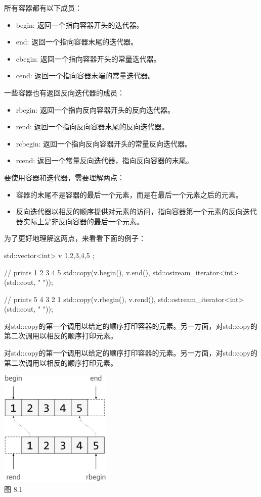 所有容器都有以下成员：

\begin{itemize}
  \item begin: 返回一个指向容器开头的迭代器。
  \item end: 返回一个指向容器末尾的迭代器。
  \item cbegin: 返回一个指向容器开头的常量迭代器。
  \item cend: 返回一个指向容器末端的常量迭代器。
\end{itemize}

一些容器也有返回反向迭代器的成员：

\begin{itemize}
  \item rbegin: 返回一个指向反向容器开头的反向迭代器。
  \item rend: 返回一个指向反向容器末尾的反向迭代器。
  \item rcbegin: 返回一个指向反向容器开头的常量反向迭代器。
  \item rcend: 返回一个常量反向迭代器，指向反向容器的末尾。
\end{itemize}

要使用容器和迭代器，需要理解两点：

\begin{itemize}
  \item 容器的末尾不是容器的最后一个元素，而是在最后一个元素之后的元素。
  \item 反向迭代器以相反的顺序提供对元素的访问，指向容器第一个元素的反向迭代器实际上是非反向容器的最后一个元素。
\end{itemize}

为了更好地理解这两点，来看看下面的例子：

\begin{cppcode}
std::vector<int> v{ 1,2,3,4,5 };

// prints 1 2 3 4 5
std::copy(v.begin(), v.end(),
		  std::ostream_iterator<int>(std::cout, " "));

// prints 5 4 3 2 1
std::copy(v.rbegin(), v.rend(),
		  std::ostream_iterator<int>(std::cout, " "));
\end{cppcode}

对std::copy的第一个调用以给定的顺序打印容器的元素。另一方面，对std::copy的第二次调用以相反的顺序打印元素。

对std::copy的第一个调用以给定的顺序打印容器的元素。另一方面，对std::copy的第二次调用以相反的顺序打印元素。

\begin{center}
  \includegraphics[width=0.4\textwidth]{images/1.png}\\
  图 8.1
\end{center}

